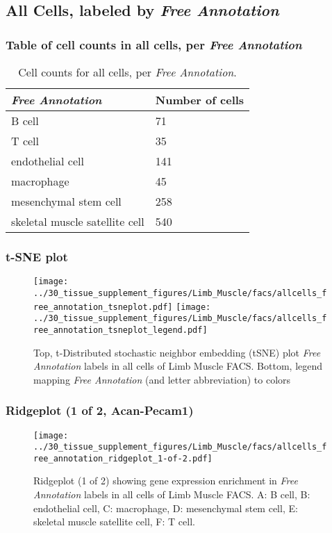 \clearpage

\subsection{All Cells, labeled by \emph{Free Annotation}}
\subsubsection{Table of cell counts in all cells, per \emph{Free Annotation}}\begin{table}[h]
\centering
\label{my-label}
\begin{tabular}{@{}ll@{}}
\toprule

\emph{Free Annotation}& Number of cells \\ \midrule
B cell & 71 \\

T cell & 35 \\

endothelial cell & 141 \\

macrophage & 45 \\

mesenchymal stem cell & 258 \\

skeletal muscle satellite cell & 540 \\
\bottomrule
\end{tabular}
\caption{Cell counts for all cells, per \emph{Free Annotation}.}
\end{table}

\clearpage
\subsubsection{t-SNE plot}
\begin{figure}[h]
\centering
\texttt{[image: ../30\_tissue\_supplement\_figures/Limb\_Muscle/facs/allcells\_free\_annotation\_tsneplot.pdf]}
\texttt{[image: ../30\_tissue\_supplement\_figures/Limb\_Muscle/facs/allcells\_free\_annotation\_tsneplot\_legend.pdf]}
\caption{Top, t-Distributed stochastic neighbor embedding (tSNE) plot  \emph{Free Annotation} labels in all cells of Limb Muscle FACS. Bottom, legend mapping \emph{Free Annotation} (and letter abbreviation) to colors}
\end{figure}


\clearpage

\subsubsection{Ridgeplot (1 of 2, Acan-Pecam1)}
\begin{figure}[h]
\centering
\texttt{[image: ../30\_tissue\_supplement\_figures/Limb\_Muscle/facs/allcells\_free\_annotation\_ridgeplot\_1-of-2.pdf]}

\caption{ Ridgeplot (1 of 2)  showing gene expression enrichment in \emph{Free Annotation} labels in all cells of Limb Muscle FACS. A: B cell, B: endothelial cell, C: macrophage, D: mesenchymal stem cell, E: skeletal muscle satellite cell, F: T cell.}
\end{figure}


